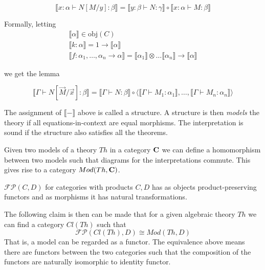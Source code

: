 \documentclass[acmsmall,screen, nonacm, anonymous]{acmart}
\begin{document}
\[
\llbracket x : \alpha \vdash N[M / y] : \beta \rrbracket =  \llbracket y : \beta \vdash N : \gamma \rrbracket \circ \llbracket x : \alpha \vdash M : \beta \rrbracket
\]

Formally, letting 
\begin{align*}
\llbracket \alpha \rrbracket \in \text{obj}(C)\\
\llbracket k : \alpha \rrbracket = 1 \to \llbracket \alpha \rrbracket\\
\llbracket f : \alpha_1, \ldots, \alpha_n \to \alpha  \rrbracket = \llbracket \alpha_1 \rrbracket \otimes \ldots \llbracket \alpha_n \rrbracket \to \llbracket \alpha \rrbracket
\end{align*}

we get the lemma 

\begin{lemma}
\[
\llbracket \Gamma \vdash N[\vec{M} / \vec{x}] : \beta \rrbracket = \llbracket \Gamma \vdash N : \beta \rrbracket \circ \langle \llbracket \Gamma \vdash M_{1} : \alpha_{1} \rrbracket, \ldots, \llbracket \Gamma \vdash M_{n} : \alpha_{n} \rrbracket \rangle
\]

\end{lemma}

The assignment of $\llbracket - \rrbracket$ above is called a structure.
A structure is then \textit{models} the theory if all equations-in-context are equal morphisms.
The interpretation is sound if the structure also satisfies all the theorems.

\begin{definition}
  Given two models of a theory $Th$ in a category $\mathbf{C}$ we can define a homomorphism between two models such that diagrams for the interpretations commute.
  This gives rise to a category $Mod(Th,\mathbf{C})$.  
\end{definition}

\begin{definition}
  $\mathcal{FP}(C,D)$ for categories with products $C,D$ has as objects product-preserving functors and as morphisms it has natural transformations.
\end{definition}

The following claim is then can be made that for a given algebraic theory $Th$ we can find a category $Cl(Th)$ such that
\[
\mathcal{FP}(Cl(Th),D) \cong Mod(Th,D)
\]
That is, a model can be regarded as a functor. 
The equivalence above means there are functors between the two categories such that the composition of the functors are naturally isomorphic to identity functor.
\end{document}
